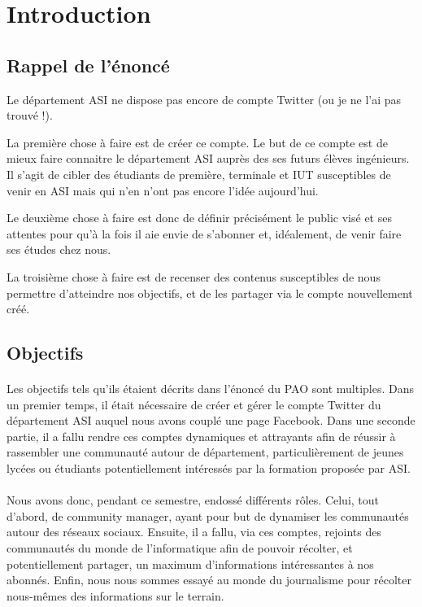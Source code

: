 \section{Introduction}

\subsection{Rappel de l'énoncé}
Le département ASI ne dispose pas encore de compte Twitter (ou je ne l'ai pas trouvé !).
 
La première chose à faire est de créer ce compte. Le but de ce compte est de mieux faire connaitre le département ASI auprès des 
ses futurs élèves ingénieurs. Il s'agit de cibler des étudiants de première, terminale et IUT susceptibles de venir en ASI mais qui 
n'en n'ont pas encore l'idée aujourd'hui. 
 
Le deuxième chose à faire est donc de définir précisément le public visé et ses attentes pour qu'à la fois il aie envie de s'abonner 
et, idéalement, de venir faire ses études chez nous.
 
La troisième chose à faire est de recenser des contenus susceptibles de nous permettre d'atteindre nos objectifs, et de les partager via 
le compte nouvellement créé. 

\subsection{Objectifs}

\paragraph{}
Les objectifs tels qu'ils étaient décrits dans l'énoncé du PAO sont multiples. Dans un premier temps, il était nécessaire de créer et gérer le compte Twitter du département ASI auquel nous avons couplé une page Facebook. Dans une seconde partie, il a fallu rendre ces comptes dynamiques et attrayants afin de réussir à rassembler une communauté autour de département, particulièrement de jeunes lycées ou étudiants potentiellement intéressés par la formation proposée par ASI.

\paragraph{}
Nous avons donc, pendant ce semestre, endossé différents rôles. Celui, tout d'abord, de community manager, ayant pour but de dynamiser les communautés autour des réseaux sociaux. Ensuite, il a fallu, via ces comptes, rejoints des communautés du monde de l'informatique afin de pouvoir récolter, et potentiellement partager, un maximum d'informations intéressantes à nos abonnés. Enfin, nous nous sommes essayé au monde du journalisme pour récolter nous-mêmes des informations sur le terrain.
